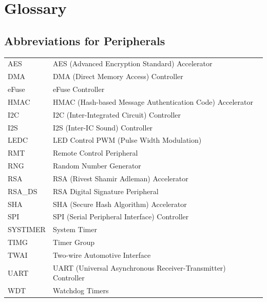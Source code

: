 \section*{Glossary}\label{glossary}
\rhead{\Navigation}

\subsection*{Abbreviations for Peripherals}

\begin{longtable}[c]{ R{3cm} p{12cm} }

AES     & AES (Advanced Encryption Standard) Accelerator \\
DMA     & DMA (Direct Memory Access) Controller \\
eFuse   & eFuse Controller \\ 
HMAC    & HMAC (Hash-based Message Authentication Code) Accelerator \\ 
I2C     & I2C (Inter-Integrated Circuit) Controller \\ 
I2S     & I2S (Inter-IC Sound) Controller \\ 
LEDC    & LED Control PWM (Pulse Width Modulation)\\ 
RMT     & Remote Control Peripheral \\
RNG     & Random Number Generator \\
RSA     & RSA (Rivest Shamir Adleman) Accelerator \\
RSA\_DS & RSA Digital Signature Peripheral \\
SHA     & SHA (Secure Hash Algorithm) Accelerator \\
SPI     & SPI (Serial Peripheral Interface) Controller \\
SYSTIMER & System Timer \\ 
TIMG    & Timer Group \\
TWAI    & Two-wire Automotive Interface \\ 
UART    & UART (Universal Asynchronous Receiver-Transmitter) Controller \\ 
WDT & Watchdog Timers \\ 

\end{longtable}





